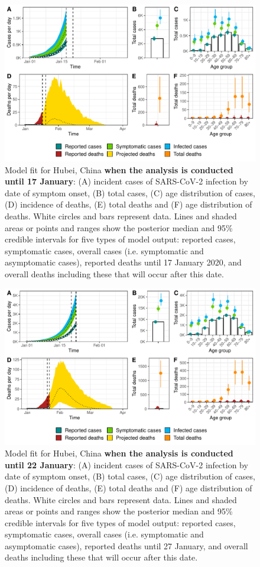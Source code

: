 \documentclass{article}
\begin{document}
\begin{figure}[H]
	\includegraphics[width=\linewidth]{../format_output/figures_v3/supp_fit_16F17.pdf}
	\caption{Model fit for Hubei, China \textbf{when the analysis is conducted until 17 January}: (A) incident cases of SARS-CoV-2 infection by date of symptom onset, (B) total cases, (C) age distribution of cases, (D) incidence of deaths, (E) total deaths and (F) age distribution of deaths. White circles and bars represent data. Lines and shaded areas or points and ranges show the posterior median and 95\% credible intervals for five types of model output: reported cases, symptomatic cases, overall cases (i.e. symptomatic and asymptomatic cases), reported deaths until 17 January 2020, and overall deaths including these that will occur after this date.}
\end{figure}
\begin{figure}[H]
\includegraphics[width=\linewidth]{../format_output/figures_v3/supp_fit_16F22.pdf}
\caption{Model fit for Hubei, China \textbf{when the analysis is conducted until 22 January}: (A) incident cases of SARS-CoV-2 infection by date of symptom onset, (B) total cases, (C) age distribution of cases, (D) incidence of deaths, (E) total deaths and (F) age distribution of deaths. White circles and bars represent data. Lines and shaded areas or points and ranges show the posterior median and 95\% credible intervals for five types of model output: reported cases, symptomatic cases, overall cases (i.e. symptomatic and asymptomatic cases), reported deaths until 27 January, and overall deaths including these that will occur after this date.}
\end{figure}
\end{document}

